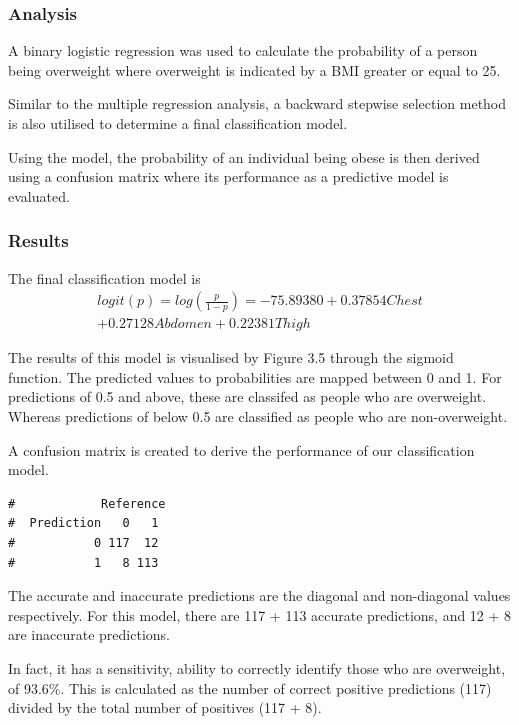 \documentclass[a4paper,9pt,twocolumn,twoside,]{pinp}
\begin{document}
\hypertarget{analysis-2}{%
\subsubsection{Analysis}\label{analysis-2}}

A binary logistic regression was used to calculate the probability of a
person being overweight where overweight is indicated by a BMI greater
or equal to 25.

Similar to the multiple regression analysis, a backward stepwise
selection method is also utilised to determine a final classification
model.

Using the model, the probability of an individual being obese is then
derived using a confusion matrix where its performance as a predictive
model is evaluated.

\hypertarget{results-1}{%
\subsubsection{Results}\label{results-1}}

The final classification model is \[
\begin{aligned}
logit(p)=log(\frac{p}{1-p})=-75.89380+0.37854Chest\\ +0.27128Abdomen+0.22381Thigh
\end{aligned}
\]

The results of this model is visualised by Figure 3.5 through the
sigmoid function. The predicted values to probabilities are mapped
between 0 and 1. For predictions of 0.5 and above, these are classifed
as people who are overweight. Whereas predictions of below 0.5 are
classified as people who are non-overweight.

A confusion matrix is created to derive the performance of our
classification model.

\begin{ShadedResult}
\begin{verbatim}
#            Reference
#  Prediction   0   1
#           0 117  12
#           1   8 113
\end{verbatim}
\end{ShadedResult}

The accurate and inaccurate predictions are the diagonal and
non-diagonal values respectively. For this model, there are 117 + 113
accurate predictions, and 12 + 8 are inaccurate predictions.

In fact, it has a sensitivity, ability to correctly identify those who
are overweight, of 93.6\%. This is calculated as the number of correct
positive predictions (117) divided by the total number of positives (117
+ 8).
\end{document}
